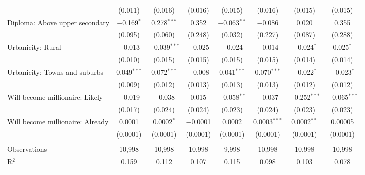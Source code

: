\begin{tabular}{@{\extracolsep{5pt}}lccccccc}
  & (0.011) & (0.016) & (0.016) & (0.015) & (0.016) & (0.015) & (0.015) \\ 
  Diploma: Above upper secondary & $-$0.169$^{*}$ & 0.278$^{***}$ & 0.352 & $-$0.063$^{**}$ & $-$0.086 & 0.020 & 0.355 \\ 
  & (0.095) & (0.060) & (0.248) & (0.032) & (0.227) & (0.087) & (0.288) \\ 
  Urbanicity: Rural & $-$0.013 & $-$0.039$^{***}$ & $-$0.025 & $-$0.024 & $-$0.014 & $-$0.024$^{*}$ & 0.025$^{*}$ \\ 
  & (0.010) & (0.015) & (0.015) & (0.015) & (0.015) & (0.014) & (0.014) \\ 
  Urbanicity: Towns and suburbs & 0.049$^{***}$ & 0.072$^{***}$ & $-$0.008 & 0.041$^{***}$ & 0.070$^{***}$ & $-$0.022$^{*}$ & $-$0.023$^{*}$ \\ 
  & (0.009) & (0.012) & (0.013) & (0.013) & (0.013) & (0.012) & (0.012) \\ 
  Will become millionaire: Likely & $-$0.019 & $-$0.038 & 0.015 & $-$0.058$^{**}$ & $-$0.037 & $-$0.252$^{***}$ & $-$0.065$^{***}$ \\ 
  & (0.017) & (0.024) & (0.024) & (0.023) & (0.024) & (0.023) & (0.023) \\ 
  Will become millionaire: Already & 0.0001 & 0.0002$^{*}$ & $-$0.0001 & 0.0002 & 0.0003$^{***}$ & 0.0002$^{**}$ & 0.00005 \\ 
  & (0.0001) & (0.0001) & (0.0001) & (0.0001) & (0.0001) & (0.0001) & (0.0001) \\ 
 \hline \\[-1.8ex] 

Observations & 10,998 & 10,998 & 10,998 & 9,998 & 10,998 & 10,998 & 10,998 \\ 
R$^{2}$ & 0.159 & 0.112 & 0.107 & 0.115 & 0.098 & 0.103 & 0.078 \\ 
\hline 
\hline \\[-1.8ex] 
\end{tabular} 